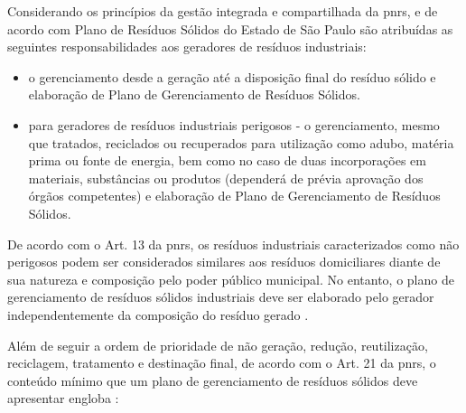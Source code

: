 Considerando os princípios da gestão integrada e compartilhada da \gls{pnrs}, e de acordo com Plano de Resíduos Sólidos do Estado de São Paulo são atribuídas as seguintes responsabilidades aos geradores de resíduos industriais:

\begin{itemize}
	\item o gerenciamento desde a geração até a disposição final do resíduo sólido e elaboração de Plano de Gerenciamento de Resíduos Sólidos.
	\item para geradores de resíduos industriais perigosos - o gerenciamento, mesmo que tratados, reciclados ou recuperados para utilização como adubo, matéria prima ou fonte de energia, bem como no caso de duas incorporações em materiais, substâncias ou produtos (dependerá de prévia aprovação dos órgãos competentes) e elaboração de Plano de Gerenciamento de Resíduos Sólidos.
\end{itemize}

De acordo com o Art. 13 da \gls{pnrs}, os resíduos industriais caracterizados como não perigosos podem ser considerados similares aos resíduos domiciliares diante de sua natureza e composição pelo poder público municipal. No entanto, o plano de gerenciamento de resíduos sólidos industriais deve ser elaborado pelo gerador independentemente da composição do resíduo gerado \cite{brasil:12305}.

Além de seguir a ordem de prioridade de não geração, redução, reutilização, reciclagem, tratamento e destinação final, de acordo com o Art. 21 da \gls{pnrs}, o conteúdo mínimo que um plano de gerenciamento de resíduos sólidos deve apresentar engloba \cite{brasil:12305}:

